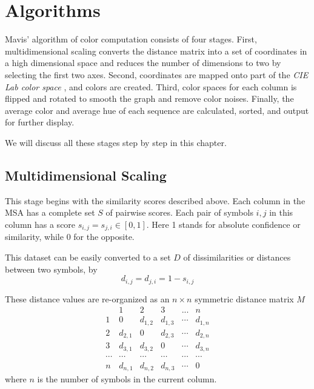 \chapter{Algorithms}\label{chap:Algorithms}

Mavis' algorithm of color computation consists of four stages. First, multidimensional scaling converts the distance matrix into a set of coordinates in a high dimensional space and reduces the number of dimensions to two by selecting the first two axes. Second, coordinates are mapped onto part of the \emph{CIE Lab color space} \cite {McLAREN:1976aa}, and colors are created. Third, color spaces for each column is flipped and rotated to smooth the graph and remove color noises. Finally, the average color and average hue of each sequence are calculated, sorted, and output for further display.

We will discuss all these stages step by step in this chapter.

\section{Multidimensional Scaling}

This stage begins with the similarity scores described above. Each column in the MSA has a complete set $S$ of pairwise scores. Each pair of symbols $i,j$ in this column has a score $s_{i,j}=s_{j,i} \in [0,1]$. Here 1 stands for absolute confidence or similarity, while 0 for the opposite.

This dataset can be easily converted to a set $D$ of dissimilarities or distances between two symbols, by $$d_{i,j}=d_{j,i}=1-s_{i,j}$$

These distance values are re-organized as an $n \times n$ symmetric distance matrix $M$
\[ \begin{array}{cccccc}
            & \mbox{1}  & \mbox{2}  & \mbox{3}  & \mbox{...}  & n       \\
\mbox{1}    & 0         & d_{1,2}   & d_{1,3}   & \cdots      & d_{1,n} \\
\mbox{2}    & d_{2,1}   & 0         & d_{2,3}   & \cdots      & d_{2,n} \\
\mbox{3}    & d_{3,1}   & d_{3,2}   & 0         & \cdots      & d_{3,n} \\
\cdots      & \cdots    & \cdots    & \cdots    & \cdots      & \cdots  \\
n           & d_{n,1}   & d_{n,2}   & d_{n,3}   & \cdots      & 0 \end{array} \]
where $n$ is the number of symbols in the current column.

